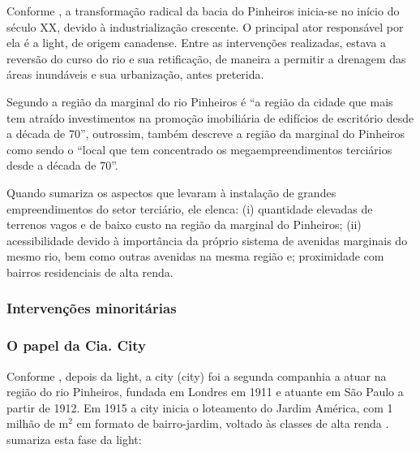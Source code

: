 \documentclass[
article,			%
11pt,				%
oneside,			%
a4paper,			%
english,			%
brazil,				%
sumario=tradicional
]{abntex2}
\begin{document}
	
	Conforme , a transformação radical da bacia do Pinheiros inicia-se no início do século XX, devido à industrialização crescente. O principal ator responsável por ela é a \glsdesc{light}, de origem canadense. Entre as intervenções realizadas, estava a reversão do curso do rio e sua retificação, de maneira a permitir a drenagem das áreas inundáveis e sua urbanização, antes preterida.
	
	Segundo  a região da marginal do rio Pinheiros é ``a região da cidade que mais tem atraído investimentos na promoção imobiliária de edifícios de escritório desde a década de 70'', outrossim,  também descreve a região da marginal do Pinheiros como sendo o ``local que tem concentrado os megaempreendimentos terciários desde a década de 70''.

	Quando  sumariza os aspectos que levaram à instalação de grandes empreendimentos do setor terciário, ele elenca: (i) quantidade elevadas de terrenos vagos e de baixo custo na região da marginal do Pinheiros; (ii) acessibilidade devido à importância da próprio sistema de avenidas marginais do mesmo rio, bem como outras avenidas na mesma região e; proximidade com bairros residenciais de alta renda.

	\subsubsection{Intervenções minoritárias} \label{s3:minoritariaspinheiros}
	
	\subsubsection{O papel da Cia. City} \label{s3:ciacity}
	
	Conforme , depois da \gls{light}, a \gls{city} (\glsdesc{city}) foi a segunda companhia a atuar na região do rio Pinheiros, fundada em Londres em 1911 e atuante em São Paulo a partir de 1912. Em 1915 a \gls{city} inicia o loteamento do Jardim América, com 1 milhão de m$^{2}$ em formato de bairro-jardim, voltado às classes de alta renda .  sumariza esta fase da \gls{light}:
	
\end{document}
